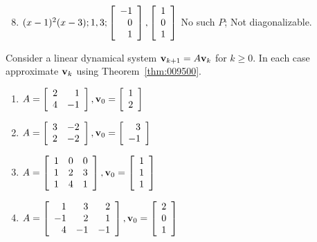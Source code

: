 \begin{multicols}{2}
\begin{ex}
\begin{sol}
\begin{enumerate}[label={\alph*.}]
\setcounter{enumi}{7}
\item $(x-1)^2(x-3) ; 1, 3; \left[ \begin{array}{r}
-1 \\
0 \\
1
\end{array}\right], \left[ \begin{array}{r}
1 \\
0 \\
1
\end{array}\right]$
 No such $P$; Not diagonalizable.
\end{enumerate}
\end{sol}
\end{ex}

\begin{ex}
Consider a linear dynamical system $\textbf{v}_{k+1} = A\textbf{v}_{k}$ for $k \geq 0$. In each case approximate $\textbf{v}_{k}$ using Theorem~\ref{thm:009500}.


\begin{enumerate}[label={\alph*.}]
\item $A = \left[ \begin{array}{rr}
2 & 1 \\
4 & -1 
\end{array}\right], \textbf{v}_0 = \left[ \begin{array}{r}
1 \\
2
\end{array}\right]$


\item $A = \left[ \begin{array}{rr}
3 & -2 \\
2 & -2 
\end{array}\right], \textbf{v}_0 = \left[ \begin{array}{r}
3 \\
-1
\end{array}\right]$


\item $A = \left[ \begin{array}{rrr}
1 & 0 & 0  \\
1 & 2 & 3 \\
1 & 4 & 1  
\end{array}\right], \textbf{v}_0 = \left[ \begin{array}{r}
1 \\
1 \\
1
\end{array}\right]$


\item $A = \left[ \begin{array}{rrr}
1 & 3 & 2  \\
-1 & 2 & 1 \\
4 & -1 & -1  
\end{array}\right], \textbf{v}_0 = \left[ \begin{array}{r}
2 \\
0 \\
1
\end{array}\right]$



\end{enumerate}
\end{ex}
\end{multicols}
